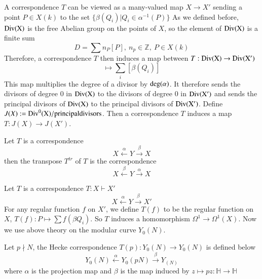 \documentclass[11pt]{article}
\begin{document}
A correspondence $T$ can be viewed as a many-valued map $X\rightarrow X'$ sending a point $P\in X(k)$ to the set $\{\beta(Q_i)|Q_i\in \alpha^{-1}(P)\}$
As we defined before, $\rm{Div} (X)$ is the free Abelian group on the points of $X$, so the element of $\rm{Div} (X)$ is a finite sum 
\begin{equation*}
    D=\sum n_P [P], \ n_p\in \mathbb{Z}, \ P\in X(k)
\end{equation*} 
Therefore, a correspondence $T$ then induces a map between $T:\rm{Div} (X) \rightarrow \rm{Div} (X')$
\begin{equation*}
    [P] \mapsto \sum_i [\beta(Q_i)]
\end{equation*}
This map multiplies the degree of a divisor by $\rm{deg} (\alpha)$. It therefore sends the divisors of degree $0$ in $\rm{Div} (X)$
to the divisors of degree $0$ in $\rm{Div} (X')$ and sends the principal divisors of $\rm{Div} (X)$
to the principal divisors of $\rm{Div} (X')$. Define $J(X):=\rm{Div}^{0} (X)/{principal divisors}$. Then a correspondence $T$ induces
a map $T:J(X)\rightarrow J(X')$.
\begin{definition}
    Let $T$ is a correspondence 
    \begin{equation*}
        X \stackrel{\alpha}{\longleftarrow} Y \stackrel{\beta}{\longrightarrow}X
    \end{equation*}
    then the transpose $T^{tr}$ of $T$ is the correspondence 
    \begin{equation*}
        X \stackrel{\beta}{\longleftarrow} Y \stackrel{\alpha}{\longrightarrow}X
    \end{equation*}
\end{definition}
Let $T$ is a correspondence $T:X\vdash X'$ 
\begin{equation*}
        X \stackrel{\alpha}{\longleftarrow} Y \stackrel{\beta}{\longrightarrow}X'
\end{equation*}
For any regular function $f$ on $X'$, we define $T(f)$ to be the regular function on $X$, $T(f): P\mapsto \sum f(\beta Q_i)$.
So $T$ induces a homomorphism $\Omega^{1}\rightarrow\Omega^{1}(X)$.
Now we use above theory on the modular curve $Y_0(N)$. 
\begin{definition}
    Let $p \nmid N$, the Hecke correspondence $T(p):Y_0(N)\rightarrow Y_0(N)$ is defined below
    \begin{equation*}
        Y_0(N)\stackrel{\alpha}{\longleftarrow}Y_0(pN) \stackrel{\beta}{\longrightarrow} Y_(N)
    \end{equation*}
where $\alpha$ is the projection map and $\beta$ is the map induced by $z\mapsto pz:\mathbb{H}\rightarrow\mathbb{H}$
\end{definition}
\end{document}
